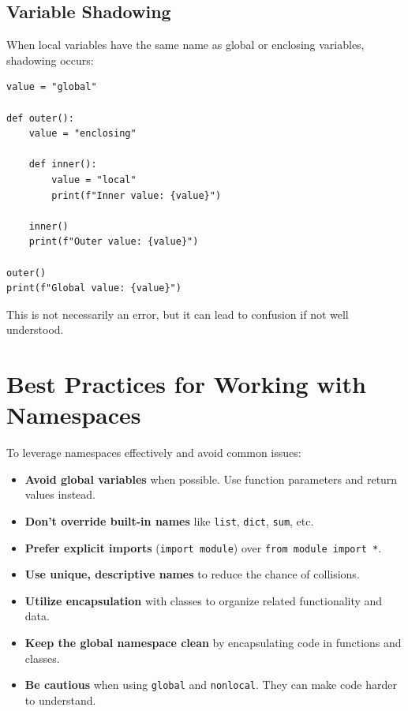 \documentclass[12pt,letterpaper]{article}
\newenvironment{macterminal}{%
    \begin{mdframed}[
        linecolor=terminalFrame,
        backgroundcolor=terminalBg,
        roundcorner=5pt,
        skipabove=10pt,
        skipbelow=10pt,
        linewidth=1pt,
        innertopmargin=10pt, %
        frametitle={%
            \tikz[baseline=(current bounding box.east), outer sep=0pt]{
                \fill[red!80!black] (0,0) circle (5pt);
                \fill[yellow!80!black] (0.7,0) circle (5pt);
                \fill[green!70!black] (1.4,0) circle (5pt);
            }
        },
        frametitlealignment=\raggedright, %
        frametitleaboveskip=8pt, %
        frametitlebelowskip=0pt, %
    ]
}{%
    \end{mdframed}%
}
\begin{document}
\subsection{Variable Shadowing}

When local variables have the same name as global or enclosing variables, shadowing occurs:

\begin{macterminal}
\begin{lstlisting}
value = "global"

def outer():
    value = "enclosing"
    
    def inner():
        value = "local"
        print(f"Inner value: {value}")
    
    inner()
    print(f"Outer value: {value}")

outer()
print(f"Global value: {value}")
\end{lstlisting}
\end{macterminal}

This is not necessarily an error, but it can lead to confusion if not well understood.

\section{Best Practices for Working with Namespaces}

To leverage namespaces effectively and avoid common issues:

\begin{itemize}
    \item \textbf{\textcolor{pythonBlue}{Avoid global variables}} when possible. Use function parameters and return values instead.
    \item \textbf{\textcolor{pythonBlue}{Don't override built-in names}} like \texttt{list}, \texttt{dict}, \texttt{sum}, etc.
    \item \textbf{\textcolor{pythonBlue}{Prefer explicit imports}} (\texttt{import module}) over \texttt{from module import *}.
    \item \textbf{\textcolor{pythonBlue}{Use unique, descriptive names}} to reduce the chance of collisions.
    \item \textbf{\textcolor{pythonBlue}{Utilize encapsulation}} with classes to organize related functionality and data.
    \item \textbf{\textcolor{pythonBlue}{Keep the global namespace clean}} by encapsulating code in functions and classes.
    \item \textbf{\textcolor{pythonBlue}{Be cautious}} when using \texttt{global} and \texttt{nonlocal}. They can make code harder to understand.
\end{itemize}
\end{document}
